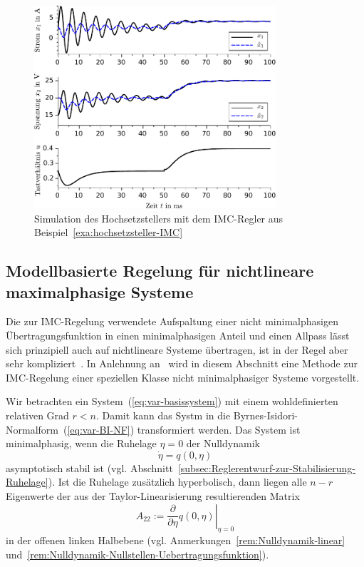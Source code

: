 \begin{figure}
\begin{centering}
\includegraphics[width=0.8\textwidth]{Hochsetzsteller_IMC_Strom}
\par\end{centering}
\caption{Simulation des Hochsetzstellers mit dem IMC-Regler aus Beispiel~\ref{exa:hochsetzsteller-IMC}\label{fig:Hochsetzsteller-IMC-Strom}}
\end{figure}


\subsection{Modellbasierte Regelung für nichtlineare maximalphasige Systeme\label{subsec:Modellbasierte-Regelung-nichtlinear-maximalphasig}}

Die zur IMC-Regelung verwendete Aufspaltung einer nicht minimalphasigen
Übertragungsfunktion in einen minimalphasigen Anteil und einen Allpass
lässt sich prinzipiell auch auf nichtlineare Systeme übertragen, ist
in der Regel aber sehr kompliziert~\cite{ball2004}. In Anlehnung
an~\cite{doyle96} wird in diesem Abschnitt eine Methode zur IMC-Regelung
einer speziellen Klasse nicht minimalphasiger Systeme vorgestellt.

Wir betrachten ein System~(\ref{eq:var-basissystem}) mit einem wohldefinierten
relativen Grad $r<n$. Damit kann das Systm in die Byrnes-Isidori-Normalform~(\ref{eq:var-BI-NF})
transformiert werden. Das System ist minimalphasig,
wenn die Ruhelage $\eta=0$ der Nulldynamik
\begin{equation}
\dot{\eta}=q(0,\eta)\label{eq:var-nulldynamik}
\end{equation}
asymptotisch stabil ist (vgl. Abschnitt~\ref{subsec:Reglerentwurf-zur-Stabilisierung-Ruhelage}).
Ist die Ruhelage zusätzlich hyperbolisch,
dann liegen alle $n-r$ Eigenwerte der aus der Taylor-Linearisierung
resultierenden Matrix 
\begin{equation}
A_{22}:=\left.\frac{\partial}{\partial\eta}q(0,\eta)\right|_{\eta=0}\label{eq:eq:var-nulldynamik-linearisierung}
\end{equation}
in der offenen linken Halbebene (vgl. Anmerkungen~\ref{rem:Nulldynamik-linear}
und~\ref{rem:Nulldynamik-Nullstellen-Uebertragungsfunktion}).

